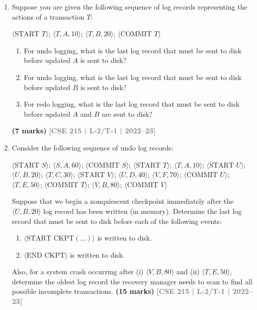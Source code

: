 \documentclass[12pt,a3paper]{article}
\newcommand{\yr}[1]{\hfill\textcolor{gray}{\small\textbf{[#1]}}}
\newcommand{\mk}[1]{\textcolor{orange!70!black}{\small\textbf{(#1 marks)}}}
\begin{document}
\begin{enumerate}
\item Suppose you are given the following sequence of log records representing the actions of a transaction $T$:
\begin{center}
\small\ttfamily
$\langle\text{START } T\rangle$; $\langle T, A, 10\rangle$; $\langle T, B, 20\rangle$; $\langle\text{COMMIT } T\rangle$
\end{center}
\begin{enumerate}
  \item For undo logging, what is the last log record that must be sent to disk before updated $A$ is sent to disk?
  \item For undo logging, what is the last log record that must be sent to disk before updated $B$ is sent to disk?
  \item For redo logging, what is the last log record that must be sent to disk before updated $A$ and $B$ are sent to disk?
\end{enumerate}
  \mk{7} \yr{CSE 215 | L-2/T-1 | 2022--23}

\item Consider the following sequence of undo log records:
\begin{center}
\small\ttfamily
$\langle\text{START } S\rangle$; $\langle S, A, 60\rangle$; $\langle\text{COMMIT } S\rangle$; $\langle\text{START } T\rangle$; $\langle T, A, 10\rangle$; 
$\langle\text{START } U\rangle$; $\langle U, B, 20\rangle$; $\langle T, C, 30\rangle$; $\langle\text{START } V\rangle$; $\langle U, D, 40\rangle$; $\langle V, F, 70\rangle$; 
$\langle\text{COMMIT } U\rangle$; $\langle T, E, 50\rangle$; $\langle\text{COMMIT } T\rangle$; $\langle V, B, 80\rangle$; $\langle\text{COMMIT } V\rangle$ 
\end{center}
Suppose that we begin a nonquiescent checkpoint immediately after the $\langle U, B, 20\rangle$ log record has been written (in memory). Determine the last log record that must be sent to disk before each of the following events:
\begin{enumerate}
  \item $\langle\text{START CKPT}(\ldots)\rangle$ is written to disk.
  \item $\langle\text{END CKPT}\rangle$ is written to disk.
\end{enumerate}
Also, for a system crash occurring after (i) $\langle V, B, 80\rangle$ and (ii) $\langle T, E, 50\rangle$, determine the oldest log record the recovery manager needs to scan to find all possible incomplete transactions.
  \mk{15} \yr{CSE 215 | L-2/T-1 | 2022--23}


\end{enumerate}
\end{document}
